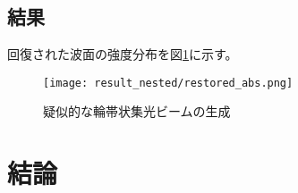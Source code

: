 \subsection{結果}

回復された波面の強度分布を図\ref{fig:result_nested_restored_abs}に示す。

\begin{figure}[!ht]
\centering
\texttt{[image: result\_nested/restored\_abs.png]}
\caption{疑似的な輪帯状集光ビームの生成}
\label{fig:result_nested_restored_abs}
\end{figure}



\clearpage
\newpage


\section{結論}
\label{chap4_conclusion}


